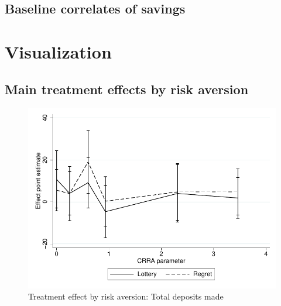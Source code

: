 \documentclass[11pt]{article}
\begin{document}
	\clearpage

%
%
%         
%         
%
%
    \subsection{Baseline correlates of savings}

        
        

    \clearpage

\section{Visualization}

	\subsection{Main treatment effects by risk aversion}

		\begin{figure}[ht]
		\centering
		\caption{Treatment effect by risk aversion: Total deposits made}
		\includegraphics[width=\textwidth]{../../figures/line-mobile_totdepositsbyrisk.pdf}
		\end{figure}
\end{document}
